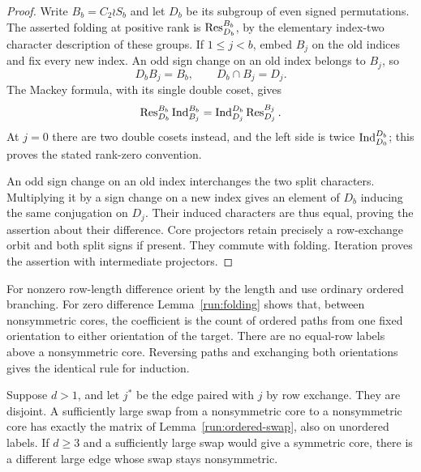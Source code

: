 \begin{proof}
Write \(B_b=C_2\wr S_b\) and let \(D_b\) be its subgroup of even
signed permutations.  The asserted folding at positive rank is
\(\operatorname{Res}^{B_b}_{D_b}\), by the elementary index-two character
description of these groups.  If \(1\leq j<b\), embed \(B_j\)
on the old indices and fix every new index.  An odd sign change
on an old index belongs to \(B_j\), so
\[
 D_bB_j=B_b,\qquad D_b\cap B_j=D_j.
 \]
The Mackey formula, with its single double coset, gives
\[
 \operatorname{Res}^{B_b}_{D_b}\operatorname{Ind}^{B_b}_{B_j}
   =\operatorname{Ind}^{D_b}_{D_j}\operatorname{Res}^{B_j}_{D_j}.
 \]
At \(j=0\) there are two double cosets instead, and the left
side is twice \(\operatorname{Ind}^{D_b}_{D_0}\); this proves the stated
rank-zero convention.

An odd sign change on an old index interchanges the two split
characters.  Multiplying it by a sign change on a new index
gives an element of \(D_b\) inducing the same conjugation on
\(D_j\).  Their induced characters are thus equal, proving
the assertion about their difference.
Core projectors retain precisely a row-exchange orbit and both
split signs if present.  They commute with folding.  Iteration
proves the assertion with intermediate projectors.
\end{proof}

For nonzero row-length difference orient by the length and use
ordinary ordered branching.  For zero difference
Lemma~\ref{run:folding} shows that, between nonsymmetric cores,
the coefficient is the count of ordered paths from one fixed
orientation to either orientation of the target.  There are no
equal-row labels above a nonsymmetric core.  Reversing paths and
exchanging both orientations gives the identical rule for
induction.

\begin{lemma}\label{run:nonsymmetric}
Suppose \(d>1\), and let \(j^*\) be the edge paired with \(j\)
by row exchange.  They are disjoint.  A sufficiently large swap
from a nonsymmetric core to a nonsymmetric core has exactly the
matrix of Lemma~\ref{run:ordered-swap}, also on unordered labels.
If \(d\geq3\) and a sufficiently large swap would give a symmetric
core, there is a different large edge whose swap stays
nonsymmetric.
\end{lemma}

